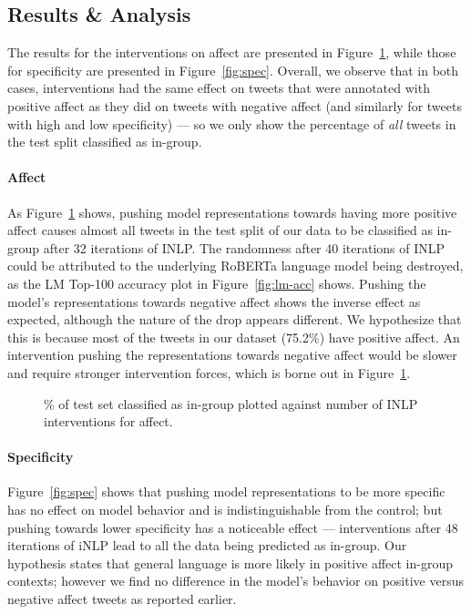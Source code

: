 \subsection{Results \& Analysis}

The results for the interventions on affect are presented in Figure~\ref{fig:affect}, while those for specificity are presented in Figure~\ref{fig:spec}. Overall, we observe that in both cases, interventions had the same effect on tweets that were annotated with positive affect as they did on tweets with negative affect (and similarly for tweets with high and low specificity) --- so we only show the percentage of \emph{all} tweets in the test split classified as in-group.

\paragraph{Affect} As Figure~\ref{fig:affect} shows, pushing model representations towards having more positive affect causes almost all tweets in the test split of our data to be classified as in-group after 32 iterations of INLP. The randomness after 40 iterations of INLP could be attributed to the underlying RoBERTa language model being destroyed, as the LM Top-100 accuracy plot in Figure~\ref{fig:lm-acc} shows. Pushing the model's representations towards negative affect shows the inverse effect as expected, although the nature of the drop appears different. We hypothesize that this is because most of the tweets in our dataset (75.2\%) have positive affect. An intervention pushing the representations towards negative affect would be slower and require stronger intervention forces, which is borne out in Figure~\ref{fig:affect}.

\begin{figure}[t]
    \centering
    
    \caption{\% of test set classified as in-group plotted against number of INLP interventions for affect.}
    \label{fig:affect}
\end{figure}

\paragraph{Specificity} Figure~\ref{fig:spec} shows that pushing model representations to be more specific has no effect on model behavior and is indistinguishable from the control; but pushing towards lower specificity has a noticeable effect --- interventions after 48 iterations of iNLP lead to all the data being predicted as in-group. Our hypothesis states that general language is more likely in positive affect in-group contexts; however we find no difference in the model's behavior on positive versus negative affect tweets as reported earlier.


